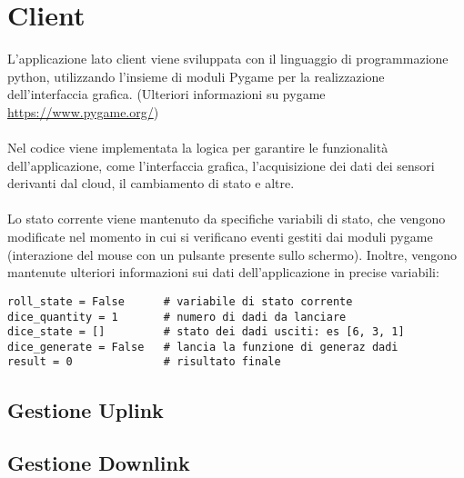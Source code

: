 \section{Client}
L'applicazione lato client viene sviluppata con il linguaggio di programmazione python, utilizzando l'insieme di moduli Pygame 
per la realizzazione dell'interfaccia grafica. (Ulteriori informazioni su pygame \href{https://www.pygame.org/}{https://www.pygame.org/})
\\\\Nel codice viene implementata la logica per garantire le funzionalità dell'applicazione, come l'interfaccia grafica, l'acquisizione 
dei dati dei sensori derivanti dal cloud, il cambiamento di stato e altre.\\\\
Lo stato corrente viene mantenuto da specifiche variabili di stato, che vengono modificate nel momento in cui si verificano eventi gestiti dai moduli pygame
(interazione del mouse con un pulsante presente sullo schermo). Inoltre, vengono mantenute ulteriori informazioni sui dati dell'applicazione in precise variabili:

\begin{verbatim}
roll_state = False      # variabile di stato corrente
dice_quantity = 1       # numero di dadi da lanciare
dice_state = []         # stato dei dadi usciti: es [6, 3, 1]
dice_generate = False   # lancia la funzione di generaz dadi
result = 0              # risultato finale
\end{verbatim}

\subsection{Gestione Uplink}


\subsection{Gestione Downlink}


